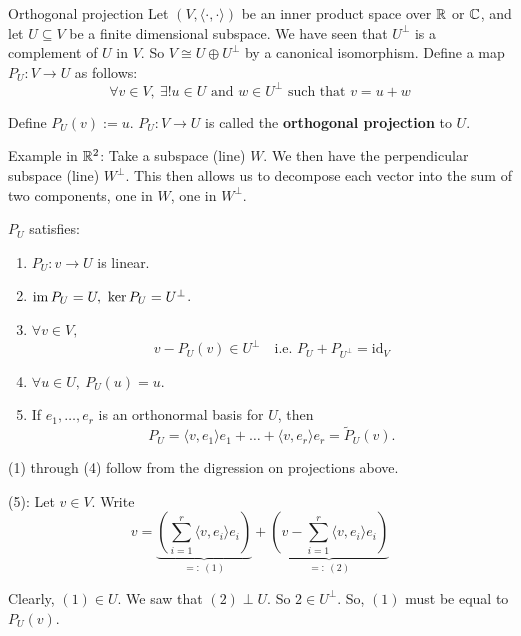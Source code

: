 \documentclass[12pt]{article}
\begin{document}
\begin{definition}{Orthogonal projection}{}
    Let $(V, \langle \cdot, \cdot \rangle)$ be an inner product space over $\mathbb{R}$ or $\mathbb{C}$, and let $U \subseteq V$ be a finite dimensional subspace. We have seen that $U^\perp$ is a complement of $U$ in $V$. So $V \cong U \oplus U^\perp$ by a canonical isomorphism. Define a map $P_U: V \rightarrow U$ as follows:
    $$
        \forall v \in V,\ \exists! u \in U \text{ and } w \in U^\perp \text{ such that } v = u + w 
    $$

    Define $P_U(v) := u$. $P_U: V \rightarrow U$ is called the \textbf{orthogonal projection} to $U$.
\end{definition}

Example in $\mathbb{R}^2$: Take a subspace (line) $W$. We then have the perpendicular subspace (line) $W^\perp$. This then allows us to decompose each vector into the sum of two components, one in $W$, one in $W^\perp$.

\begin{proposition}{}{}
    $P_U$ satisfies:
    \begin{enumerate}
        \item $P_U: v \rightarrow U$ is linear.
        \item $\operatorname{im} P_U = U,\ \ker P_U = U^\perp$.
        \item $\forall v \in V,\ $
        $$
            v - P_U(v) \in U^\perp \quad \text{i.e. } P_U + P_{U^\perp} = \mathrm{id}_V
        $$
        \item $\forall u \in U,\ P_U(u) = u$.
        \item If $e_1,\dots,e_r$ is an orthonormal basis for $U$, then
        $$
            P_U = \langle v, e_1 \rangle e_1 + \dots + \langle v, e_r \rangle e_r = \tilde{P}_{U}(v).
        $$
    \end{enumerate}
\end{proposition}

\begin{proofbox}
    (1) through (4) follow from the digression on projections above.

    (5): Let $v \in V$. Write
    $$
        v = \underbrace{\left( \sum_{i = 1}^{r} \langle v, e_i \rangle e_i \right)}_{=:\ (1)} + \underbrace{\left(v -  \sum_{i = 1}^{r} \langle v, e_i \rangle e_i \right)}_{=:\ (2)}
    $$

    Clearly, $(1) \in U$. We saw that $(2) \perp U$. So $2 \in U^\perp$. So, $(1)$ must be equal to $P_U(v)$.
\end{proofbox}
\end{document}
